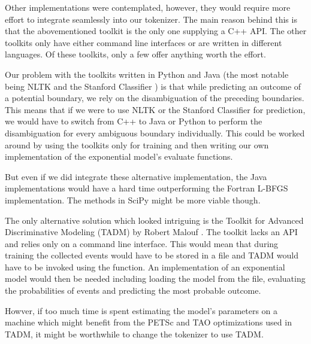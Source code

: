 Other implementations were contemplated, however, they would require more effort
to integrate seamlessly into our tokenizer. The main reason behind this is
that the abovementioned toolkit is the only one supplying a C++ API. The other
toolkits only have either command line interfaces or are written in different
languages. Of these toolkits, only a few offer anything worth the effort.

Our problem with the toolkits written in Python and Java (the most notable
being NLTK \cite{web-nltk} and the Stanford Classifier \cite{web-stanford}) is
that while predicting an outcome of a potential boundary, we rely on the
disambiguation of the preceding boundaries. This means that if we were to use
NLTK or the Stanford Classifier for prediction, we would have to switch from
C++ to Java or Python to perform the disambiguation for every ambiguous
boundary individually. This could be worked around by using the toolkits only
for training and then writing our own implementation of the exponential model's
evaluate functions.

But even if we did integrate these alternative implementation, the Java
implementations would have a hard time outperforming the Fortran L-BFGS
implementation. The methods in SciPy might be more viable though.

The only alternative solution which looked intriguing is the Toolkit for
Advanced Discriminative Modeling (TADM) by Robert Malouf \cite{web-tadm}. The
toolkit lacks an API and relies only on a command line interface. This would
mean that during training the collected events would have to be stored in a
file and TADM would have to be invoked using the  function. An
implementation of an exponential model would then be needed including loading
the model from the file, evaluating the probabilities of events and predicting
the most probable outcome.

Howver, if too much time is spent estimating the model's parameters on a
machine which might benefit from the PETSc and TAO optimizations used in TADM,
it might be worthwhile to change the tokenizer to use TADM.
